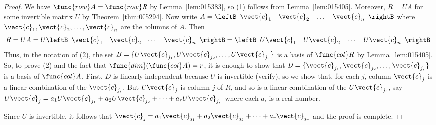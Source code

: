 \begin{proof}
We have $\func{row} A = \func{row} R$ by Lemma~\ref{lem:015383}, so (1) follows from Lemma~\ref{lem:015405}. Moreover, $R = UA$ for some invertible matrix $U$ by Theorem~\ref{thm:005294}. Now write $A =
\leftB \begin{array}{cccc}
\vect{c}_1 & \vect{c}_2 & \dots & \vect{c}_n
\end{array} \rightB$ where $\vect{c}_{1}, \vect{c}_{2}, \dots, \vect{c}_{n}$ are the columns of $A$. Then
\begin{equation*}
R = UA = U
\leftB \begin{array}{cccc}
	\vect{c}_1 & \vect{c}_2 & \cdots & \vect{c}_n
\end{array} \rightB
= 
\leftB \begin{array}{cccc}
	U\vect{c}_1 & U\vect{c}_2 & \cdots & U\vect{c}_n
\end{array} \rightB
\end{equation*}
Thus, in the notation of (2), the set $B = \{U\vect{c}_{j_{1}}, U\vect{c}_{j_{2}}, \dots, U\vect{c}_{j_{r}}\}$ is a basis of $\func{col} R$ by Lemma~\ref{lem:015405}. So, to prove (2) and the fact that $\func{dim}(\func{col} A) = r$, it is enough to show that $D = \{\vect{c}_{j_{1}}, \vect{c}_{j_{2}}, \dots, \vect{c}_{j_{r}}\}$ is a basis of $\func{col} A$. First, $D$ is linearly independent because $U$ is invertible (verify), so we show that, for each $j$, column $\vect{c}_{j}$ is a linear combination of the $\vect{c}_{j_{i}}$. But $U\vect{c}_{j}$ is column $j$ of $R$, and so is a linear combination of the $U\vect{c}_{j_{i}}$, say $U\vect{c}_{j} = a_{1}U\vect{c}_{j_{1}} + a_{2}U\vect{c}_{j_{2}} + \dots + a_{r}U\vect{c}_{j_{r}}$ where each $a_{i}$ is a real number.

Since $U$ is invertible, it follows that
$\vect{c}_{j} =
a_{1}\vect{c}_{j_{1}} +
a_{2}\vect{c}_{j_{2}} +
\dots +
a_{r}\vect{c}_{j_{r}}$ and the proof is complete.
\end{proof}

